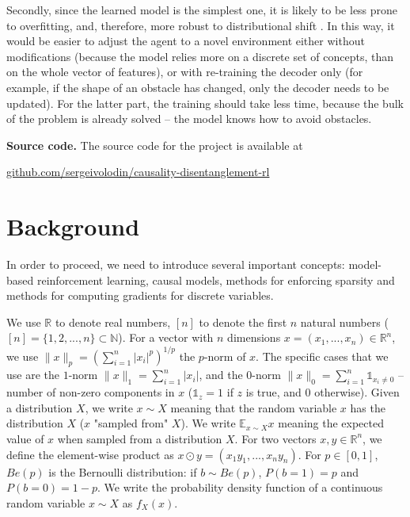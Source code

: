 \documentclass[a4paper,11pt,oneside]{report}
\begin{document}
Secondly, since the learned model is the simplest one, it is likely to be less prone to overfitting, and, therefore, more robust to distributional shift \cite{VanSteenkiste2020,Gomez2006,Priol2021}. In this way, it would be easier to adjust the agent to a novel environment either without modifications (because the model relies more on a discrete set of concepts, than on the whole vector of features), or with re-training the decoder only (for example, if the shape of an obstacle has changed, only the decoder needs to be updated). For the latter part, the training should take less time, because the bulk of the problem is already solved -- the model knows how to avoid obstacles.

{\bf Source code.} The source code for the project is available at
\begin{center}
\href{https://github.com/sergeivolodin/causality-disentanglement-rl}{github.com/sergeivolodin/causality-disentanglement-rl}
\end{center}

\chapter{Background}
\label{ch:background}

In order to proceed, we need to introduce several important concepts: model-based reinforcement learning, causal models, methods for enforcing sparsity and methods for computing gradients for discrete variables.

We use $\mathbb R$ to denote real numbers, $[n]$ to denote the first $n$ natural numbers ($[n]=\{1, 2, ..., n\}\subset \mathbb N$). For a vector with $n$ dimensions $x=(x_1,...,x_n)\in \mathbb R^n$, we use $\|x\|_p=\left(\sum_{i=1}^n|x_i|^p\right)^{1/p}$ the $p$-norm of $x$. The specific cases that we use are the $1$-norm $\|x\|_1=\sum\limits_{i=1}^n|x_i|$, and the $0$-norm $\|x\|_0=\sum\limits_{i=1}^n\mathds 1_{x_i\neq 0}$ -- number of non-zero components in $x$ ($\mathds 1_z=1$ if $z$ is true, and $0$ otherwise).
Given a distribution $X$, we write $x\sim X$ meaning that the random variable $x$ has the distribution $X$ ($x$ "sampled from" $X$). We write $\mathbb E_{x\sim X} x$ meaning the expected value of $x$ when sampled from a distribution $X$. For two vectors $x,y\in\mathbb R^{n}$, we define the element-wise product as $x\odot y=(x_1y_1,...,x_ny_n)$. For $p\in[0,1]$, $Be(p)$ is the Bernoulli distribution: if $b\sim Be(p)$, $P(b=1)=p$ and $P(b=0)=1-p$. We write the probability density function of a continuous random variable $x\sim X$ as $f_X(x)$.
\end{document}
